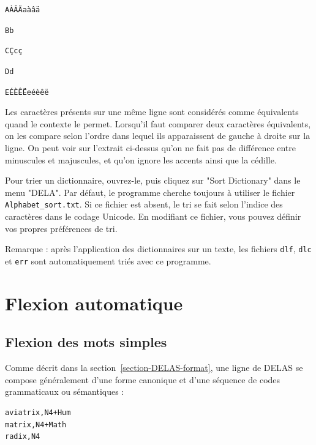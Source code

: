 \bigskip
\begin{minipage}{\textwidth}
\noindent\texttt{AÀÂÄaàâä}

\noindent\texttt{Bb}

\noindent\texttt{CÇcç}

\noindent\texttt{Dd}

\noindent\texttt{EÉÈÊËeéèêë}
\end{minipage}

\bigskip
\noindent Les caractères présents sur une même ligne sont considérés comme équivalents quand
le contexte le permet. Lorsqu’il faut comparer deux caractères équivalents, on les compare
selon l’ordre dans lequel ils apparaissent de gauche à droite sur la ligne. On peut voir sur
l’extrait ci-dessus qu’on ne fait pas de différence entre minuscules et majuscules, et qu’on
ignore les accents ainsi que la cédille.


\bigskip
\noindent Pour trier un dictionnaire, ouvrez-le, puis cliquez sur "Sort Dictionary" dans le menu
"DELA". Par défaut, le programme cherche toujours à utiliser le fichier \verb+Alphabet_sort.txt+.
Si ce fichier est absent, le tri se fait selon l’indice des caractères dans le codage Unicode.
En modifiant ce fichier, vous pouvez définir vos propres préférences de tri.


\bigskip
\noindent Remarque : après l’application des dictionnaires sur un texte, les fichiers
\verb+dlf+, \verb+dlc+ et \verb+err+ sont automatiquement triés avec ce programme.
 



\section{Flexion automatique}
\label{section-automatic-inflection}
\subsection{Flexion des mots simples}

Comme décrit dans la section~\ref{section-DELAS-format}, une ligne de DELAS se compose généralement
d’une forme canonique et d’une séquence de codes grammaticaux ou sémantiques :


\begin{verbatim}
aviatrix,N4+Hum
matrix,N4+Math
radix,N4
\end{verbatim}

